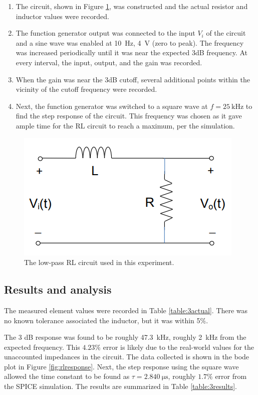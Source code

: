 \documentclass{report}
\begin{document}
\begin{enumerate}
	\item The circuit, shown in Figure \ref{fig:rl}, was constructed and the actual resistor and inductor values were recorded.
	\item The function generator output was connected to the input $V_i$ of the circuit and a sine wave was enabled at \SI{10}{\Hz}, \SI{4}{\V} (zero to peak). The frequency was increased periodically until it was near the expected 3dB frequency. At every interval, the input, output, and the gain was recorded. 
	\item When the gain was near the 3dB cutoff, several additional points within the vicinity of the cutoff frequency were recorded.
	\item Next, the function generator was switched to a square wave at $f=\SI{25}{\kHz}$ to find the step response of the circuit. This frequency was chosen as it gave ample time for the RL circuit to reach a maximum, per the simulation.
\end{enumerate}

\begin{figure}[h]
	\centering
	\includegraphics[width=0.4\linewidth]{rl}
	\caption{The low-pass RL circuit used in this experiment.}
	\label{fig:rl}
\end{figure}

\subsection{Results and analysis}
The measured element values were recorded in Table \ref{table:3actual}. There was no known tolerance associated the inductor, but it was within 5\%.

The 3 dB response was found to be roughly \SI{47.3}{\kHz}, roughly \SI{2}{\kHz} from the expected frequency. This $4.23\%$ error is likely due to the real-world values for the unaccounted impedances in the circuit. The data collected is shown in the bode plot in Figure \ref{fig:rlresponse}. Next, the step response using the square wave allowed the time constant to be found as $\tau=\SI{2.840}{\micro\second}$, roughly $1.7\%$ error from the SPICE simulation. The results are summarized in Table \ref{table:3results}.
\end{document}
